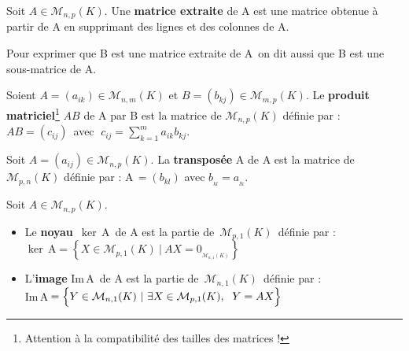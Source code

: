 \vspace{2.3cm}

Soit \(A\in\mathcal{M}_{n,p}(K)\). Une \textbf{matrice extraite} de A est une matrice obtenue à partir de A en supprimant des lignes et des colonnes de A.\vspace{0.1cm}\\
\begin{small}
    Pour exprimer que B est une \guillemetleft matrice extraite de A\guillemetright \ on dit aussi que \guillemetleft B est une sous-matrice de A\guillemetright.
\end{small}

\newpage

Soient \(A=(a_{ik})\in\mathcal{M}_{n,m}(K)\) et \(B=(b_{kj})\in\mathcal{M}_{m,p}(K)\).
Le \textbf{produit matriciel}\footnote{Attention à la compatibilité des tailles des matrices !} \(AB\) de A par B est la matrice de \(\mathcal{M}_{n,p}(K)\) définie par : \(AB=(c_{ij})\,\) avec \(\;\displaystyle c_{ij}=\sum_{k=1}^{m}a_{ik}b_{kj}\).

\vspace{1.4cm}

\noindent Soit \(A=(a_{ij})\in\mathcal{M}_{n,p}(K)\). La \textbf{transposée} A de A est la matrice de \(\mathcal{M}_{p,n}(K)\) définie par :
A\(\,=(b_{kl})\) avec \(\displaystyle b_{_{kl}}=a_{_{lk}}\). 

\vspace{1.4cm}

\noindent Soit \(A\in \mathcal{M}_{n,p}(K)\).\vspace{-0.1cm}
\begin{itemize}[leftmargin=1cm, label=•]
    \item Le \textbf{noyau} \(\,\ker\,\)A\, de A est la partie de \(\,\mathcal{M}_{p,1}(K)\,\) définie par :\vspace{0.1cm}\\
    \(\ker\,\text{A}= \left\{ X\in\mathcal{M}_{p,1}(K) \ \vert \ AX=0_{_{\mathcal{M}_{n,1}(K)}}\right\} \)\vspace{0.2cm}

    \item L'\textbf{image} Im\,A\, de A est la partie de \(\,\mathcal{M}_{n,1}(K)\,\) définie par :\vspace{0.1cm}\\
    Im\,A\(\,=\Bigl\{ Y\in \mathcal{M}_{n,1}(K)\ \vert \ \exists X\in \mathcal{M}_{p,1}(K), \; \ Y=AX \Bigr\}\)
\end{itemize}

